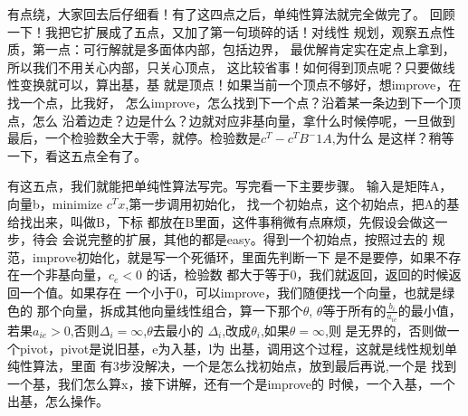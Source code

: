 {
	有点绕，大家回去后仔细看！有了这四点之后，单纯性算法就完全做完了。
}
{
	回顾一下！我把它扩展成了五点，又加了第一句琐碎的话！对线性
	规划，观察五点性质，第一点：可行解就是多面体内部，包括边界，
	最优解肯定实在定点上拿到，所以我们不用关心内部，只关心顶点，
	这比较省事！如何得到顶点呢？只要做线性变换就可以，算出基，基
	就是顶点！如果当前一个顶点不够好，想improve，在找一个点，比我好，
	怎么improve，怎么找到下一个点？沿着某一条边到下一个顶点，怎么
	沿着边走？边是什么？边就对应非基向量，拿什么时候停呢，一旦做到
	最后，一个检验数全大于零，就停。检验数是$c^T - c^TB^-1A$,为什么
	是这样？稍等一下，看这五点全有了。
}
{
	有这五点，我们就能把单纯性算法写完。写完看一下主要步骤。
	输入是矩阵A，向量b，minimize $c^Tx$,第一步调用初始化，
	找一个初始点，这个初始点，把A的基给找出来，叫做B，下标
	都放在B里面，这件事稍微有点麻烦，先假设会做这一步，待会
	会说完整的扩展，其他的都是easy。得到一个初始点，按照过去的
	规范，improve初始化，就是写一个死循环，里面先判断一下
	是不是要停，如果不存在一个非基向量，$c_{e} < 0$ 的话，检验数
	都大于等于0，我们就返回，返回的时候返回一个值。如果存在
	一个小于0，可以improve，我们随便找一个向量，也就是绿色的
	那个向量，拆成其他向量线性组合，算一下那个$\theta$,
	$\theta$等于所有的$\frac{b_{i}}{a_{ie}}$的最小值，若果$
	a_{ie} > 0$,否则$\Delta_{i} = \infty$,$\theta$去最小的
	$\Delta_{i}$,改成$\theta_{i}$,如果$\theta = \infty$,则
	是无界的，否则做一个pivot，pivot是说旧基，e为入基，l为
	出基，调用这个过程，这就是线性规划单纯性算法，里面
	有3步没解决，一个是怎么找初始点，放到最后再说,一个是
	找到一个基，我们怎么算x，接下讲解，还有一个是improve的
	时候，一个入基，一个出基，怎么操作。


}
